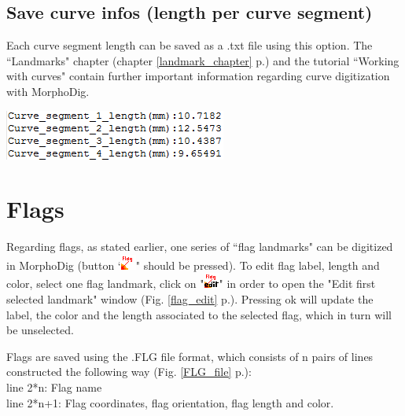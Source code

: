 \subsection{Save curve infos (length per curve segment)}
\begin{minipage}{0.55\textwidth}

Each curve segment length can be saved as a .txt file
using this option.
The ``Landmarks" chapter (chapter \ref{landmark_chapter} p.\pageref{landmark_chapter}) and the
tutorial ``Working with curves" contain further important
information regarding curve digitization with MorphoDig.

\end{minipage}  
 \begin{minipage}{0.45\textwidth}\centering
  \includegraphics[scale=0.5]{images/07/curves/Curve_infos.png}
 \end{minipage} 

\section{Flags}

Regarding flags, as stated earlier, one series of ``flag landmarks" can be digitized in MorphoDig (button `\includegraphics[scale=0.7]{images/04/flag_landmarks.png}" should
be pressed). To edit flag label, length and color, select one
flag landmark, click on "\includegraphics[scale=0.7]{images/06/objects/flag_edit.png}" in order to open the "Edit first selected landmark" window (Fig. \ref{flag_edit} p.\pageref{flag_edit}). Pressing ok will update the label, the color and the length associated to the selected flag, which in turn will be unselected. 

\noindent
Flags are saved using the .FLG file format, which consists of n pairs of lines constructed the following way (Fig. \ref{FLG_file} p.\pageref{FLG_file}):\\
line 2*n: Flag name\\
line 2*n+1: Flag coordinates, flag orientation, flag length and color.

